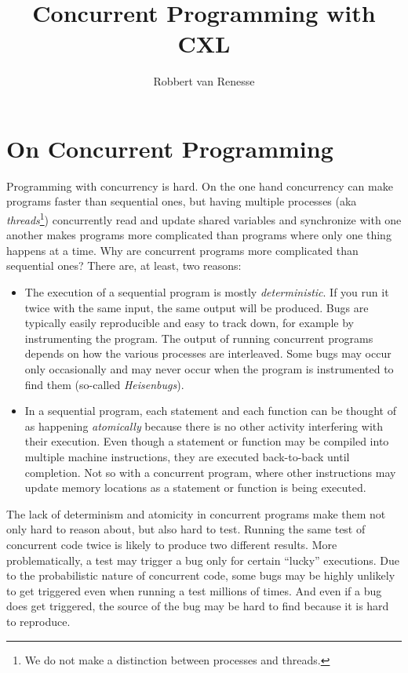 \documentclass{report}
\title{Concurrent Programming with CXL}
\author{Robbert van Renesse}
\begin{document}
\maketitle
\tableofcontents

\chapter{On Concurrent Programming}

Programming with concurrency is hard.  On the one hand concurrency
can make programs faster than sequential ones, but having multiple
processes (aka \emph{threads}\footnote{We
do not make a distinction between processes and threads.}) concurrently
read and update shared variables
and synchronize with one another makes programs more complicated than
programs where only one thing happens at a time.  Why are concurrent
programs more complicated than sequential ones?
There are, at least, two reasons:
\begin{itemize}
\item The execution of a sequential
program is mostly \emph{deterministic}.
If you run it twice with the same input, the same output will be produced.
Bugs are typically easily reproducible and easy to track down, for example
by instrumenting the program.
The output of running concurrent programs depends on how the various
processes are interleaved.  Some bugs may occur only occasionally and
may never occur when the program is instrumented to find them
(so-called \emph{Heisenbugs}).
\item In a sequential program, each statement and each function can be
thought of as happening \emph{atomically}
because there is no other activity
interfering with their execution.  Even though a statement or function may
be compiled into multiple machine instructions, they are executed back-to-back
until completion.  Not so with a concurrent program, where other instructions
may update memory locations as a statement or function is being executed.
\end{itemize}
The lack of determinism and atomicity in concurrent programs make them
not only hard to reason about, but also hard to test.
Running the same test of concurrent code twice is likely to produce
two different results.  More problematically, a test may trigger a
bug only for certain ``lucky'' executions.  Due to the probabilistic
nature of concurrent code, some bugs may be highly unlikely to get
triggered even when running a test millions of times.  And even if
a bug does get triggered, the source of the bug may be hard to find
because it is hard to reproduce.
\end{document}

